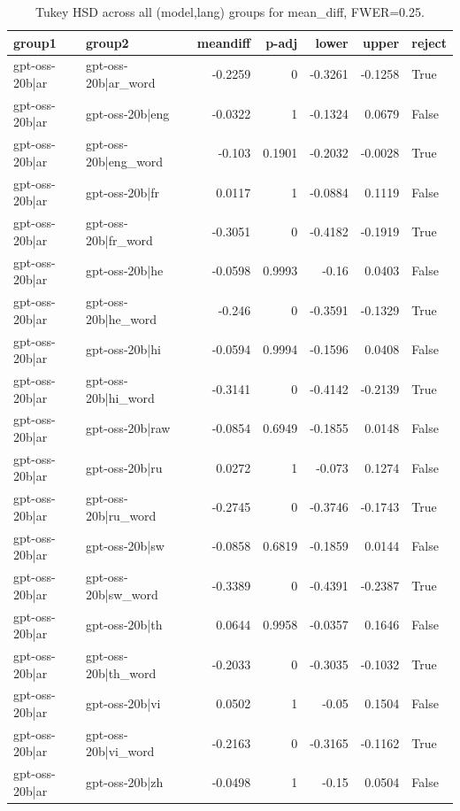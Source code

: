 \begin{table}
\caption{Tukey HSD across all (model,lang) groups for mean_diff, FWER=0.25.}
\label{tab:tukey_all_models_all_langs_mean_diff}
\begin{tabular}{l l r r r r l}
\toprule
group1 & group2 & meandiff & p-adj & lower & upper & reject \\
\midrule
gpt-oss-20b|ar & gpt-oss-20b|ar_word & -0.2259 & 0 & -0.3261 & -0.1258 & True \\
gpt-oss-20b|ar & gpt-oss-20b|eng & -0.0322 & 1 & -0.1324 & 0.0679 & False \\
gpt-oss-20b|ar & gpt-oss-20b|eng_word & -0.103 & 0.1901 & -0.2032 & -0.0028 & True \\
gpt-oss-20b|ar & gpt-oss-20b|fr & 0.0117 & 1 & -0.0884 & 0.1119 & False \\
gpt-oss-20b|ar & gpt-oss-20b|fr_word & -0.3051 & 0 & -0.4182 & -0.1919 & True \\
gpt-oss-20b|ar & gpt-oss-20b|he & -0.0598 & 0.9993 & -0.16 & 0.0403 & False \\
gpt-oss-20b|ar & gpt-oss-20b|he_word & -0.246 & 0 & -0.3591 & -0.1329 & True \\
gpt-oss-20b|ar & gpt-oss-20b|hi & -0.0594 & 0.9994 & -0.1596 & 0.0408 & False \\
gpt-oss-20b|ar & gpt-oss-20b|hi_word & -0.3141 & 0 & -0.4142 & -0.2139 & True \\
gpt-oss-20b|ar & gpt-oss-20b|raw & -0.0854 & 0.6949 & -0.1855 & 0.0148 & False \\
gpt-oss-20b|ar & gpt-oss-20b|ru & 0.0272 & 1 & -0.073 & 0.1274 & False \\
gpt-oss-20b|ar & gpt-oss-20b|ru_word & -0.2745 & 0 & -0.3746 & -0.1743 & True \\
gpt-oss-20b|ar & gpt-oss-20b|sw & -0.0858 & 0.6819 & -0.1859 & 0.0144 & False \\
gpt-oss-20b|ar & gpt-oss-20b|sw_word & -0.3389 & 0 & -0.4391 & -0.2387 & True \\
gpt-oss-20b|ar & gpt-oss-20b|th & 0.0644 & 0.9958 & -0.0357 & 0.1646 & False \\
gpt-oss-20b|ar & gpt-oss-20b|th_word & -0.2033 & 0 & -0.3035 & -0.1032 & True \\
gpt-oss-20b|ar & gpt-oss-20b|vi & 0.0502 & 1 & -0.05 & 0.1504 & False \\
gpt-oss-20b|ar & gpt-oss-20b|vi_word & -0.2163 & 0 & -0.3165 & -0.1162 & True \\
gpt-oss-20b|ar & gpt-oss-20b|zh & -0.0498 & 1 & -0.15 & 0.0504 & False \\

\end{tabular}
\end{table}
